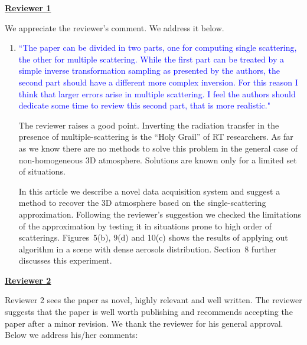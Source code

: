 \documentclass[12pt]{article}
\begin{document}
\noindent \underline {\bf Reviewer 1}

We appreciate the reviewer's comment. We address it below.

\begin{enumerate}

\item \textcolor{blue}{ ``The paper can be divided in two parts, one
    for computing single scattering, the other for multiple
    scattering. While the first part can be treated by a simple
    inverse transformation sampling as presented by the authors, the
    second part should have a different more complex inversion. For
    this reason I think that larger errors arise in multiple
    scattering. I feel the authors should dedicate some time to review
    this second part, that is more realistic."}

  {
    The reviewer raises a good point. Inverting the radiation transfer
    in the presence of multiple-scattering is the ``Holy Grail''
    of RT researchers. As far as we know there are no methods to
    solve this problem in the general case of non-homogeneous 3D
    atmosphere. Solutions are known only for a limited set of 
    situations.
    
    In this article we describe a novel data acquisition system
    and suggest a method to recover the 3D atmosphere based on
    the single-scattering approximation. Following the reviewer's
    suggestion we checked the limitations of the approximation
    by testing it in situations prone to high order of scatterings.
    Figures~5(b), 9(d) and 10(c) shows the results of applying
    out algorithm in a scene with dense aerosols distribution.
    Section~8 further discusses this experiment.
  }

\end{enumerate}

\noindent \underline {\bf Reviewer 2}

Reviewer 2 sees the paper as novel, highly relevant and well written.
The reviewer suggests that the paper is well worth publishing and
recommends accepting the paper after a minor revision.  We thank the
reviewer for his general approval. Below we address his/her comments:
\end{document}
